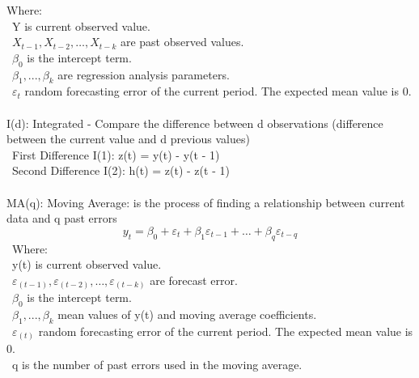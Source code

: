 \documentclass{ieeeojies}
\begin{document}
Where:\\
	\indent\textbullet\ Y is current observed value.\\
	\indent\textbullet\ \(X_{t-1}, X_{t-2}, \ldots, X_{t-k}\) are past observed
values.\\
	\indent\textbullet\ \(\beta_0\) is the intercept term.\\
	\indent\textbullet\ \(\beta_1,..., \beta_k\) are regression analysis
parameters.\\
	\indent\textbullet\ \(\varepsilon_{t}\) random forecasting error of the current
period. The expected mean value is 0.\\
\\
\indent I(d): Integrated - Compare the difference between d observations (difference
between the current value and d previous values)\\
\indent\textbullet\ First Difference I(1): z(t) = y(t) - y(t - 1)\\
\indent\textbullet\ Second Difference I(2): h(t) = z(t) - z(t - 1)\\
\\
\indent MA(q): Moving Average: is the process of finding a relationship between
current data and q past errors\
\indent \[y_{t} = \beta_0 + \varepsilon_{t} + \beta_1\varepsilon_{t - 1} + \ldots + \beta_q\varepsilon_{t - q}\]\
Where:\\
        \indent\textbullet\ y(t) is current observed value.\\
	\indent\textbullet\ \(\varepsilon_(t-1), \varepsilon_(t-2), \ldots, \varepsilon_(t-k)\) are forecast error.\\
	\indent\textbullet\ \(\beta_0\) is the intercept term.\\
	\indent\textbullet\ \(\beta_1,..., \beta_k\) mean values of y(t) and moving
average coefficients.\\
	\indent\textbullet\ \(\varepsilon_(t)\) random forecasting error of the current
period. The expected mean value is 0.\\
        \indent\textbullet\ q is the number of past errors used in the moving average.
\end{document}
